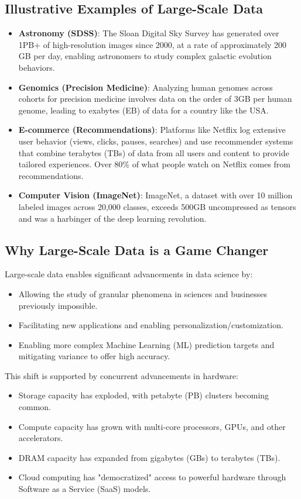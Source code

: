 \documentclass{article}
\begin{document}
\subsection*{Illustrative Examples of Large-Scale Data}
\begin{itemize}
    \item \textbf{Astronomy (SDSS)}: The Sloan Digital Sky Survey has generated over 1PB+ of high-resolution images since 2000, at a rate of approximately 200 GB per day, enabling astronomers to study complex galactic evolution behaviors.
    \item \textbf{Genomics (Precision Medicine)}: Analyzing human genomes across cohorts for precision medicine involves data on the order of 3GB per human genome, leading to exabytes (EB) of data for a country like the USA.
    \item \textbf{E-commerce (Recommendations)}: Platforms like Netflix log extensive user behavior (views, clicks, pauses, searches) and use recommender systems that combine terabytes (TBs) of data from all users and content to provide tailored experiences. Over 80\% of what people watch on Netflix comes from recommendations.
    \item \textbf{Computer Vision (ImageNet)}: ImageNet, a dataset with over 10 million labeled images across 20,000 classes, exceeds 500GB uncompressed as tensors and was a harbinger of the deep learning revolution.
\end{itemize}

\subsection*{Why Large-Scale Data is a Game Changer}
Large-scale data enables significant advancements in data science by:
\begin{itemize}
    \item Allowing the study of granular phenomena in sciences and businesses previously impossible.
    \item Facilitating new applications and enabling personalization/customization.
    \item Enabling more complex Machine Learning (ML) prediction targets and mitigating variance to offer high accuracy.
\end{itemize}
This shift is supported by concurrent advancements in hardware:
\begin{itemize}
    \item Storage capacity has exploded, with petabyte (PB) clusters becoming common.
    \item Compute capacity has grown with multi-core processors, GPUs, and other accelerators.
    \item DRAM capacity has expanded from gigabytes (GBs) to terabytes (TBs).
    \item Cloud computing has "democratized" access to powerful hardware through Software as a Service (SaaS) models.
\end{itemize}
\end{document}
